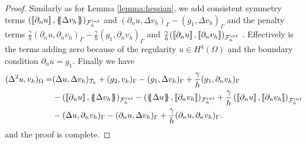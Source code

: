 \begin{proof}
Similarly as for Lemma \ref{lemma:hessian}, we add consistent symmetry terms $(  \left[\!\left[  \partial _{n} u  \right]\!\right], \left\{\!\!\left\{ \Delta  v_{h} \right\}\!\!\right\})_{\mathcal{F}^{int}_{h} } $ and $(  \partial _{n} u, \Delta  v_{h}       )_{\Gamma  } -(  g_{1}, \Delta  v_{h}  )_{\Gamma  }  $ and
the penalty terms $ \frac{\gamma }{h} (  \partial _{n} u, \partial _{n}   v_{h}       )_{\Gamma  } -\frac{\gamma }{h}(  g_{1}, \partial _{n} v_{h}  )_{\Gamma  }$ and $\frac{\gamma }{h}( \left[\!\left[  \partial _{n} u  \right]\!\right] , \left[\!\left[  \partial _{n} v_{h}  \right]\!\right]
)_{\mathcal{F}^{int}_{h} }  $  . Effectively is the terms adding zero
because of the regularity $ u \in H^{4}( \Omega ) $ and the boundary condition $\partial _{n} u = g_{1}$.
Finally we have
\[
    \begin{split}
( \Delta ^2 u, v_{h} ) _{\Omega }  =& ( \Delta u, \Delta v_{h})_{\mathcal{T} _{h} }  + ( g_{2} , v_{h} )_{\Gamma }  - ( g_{1} , \Delta v_{h})_{\Gamma } + \frac{\gamma }{h} ( g_{1} ,  \partial _{n}v_{h})_{\Gamma }\\
& -  ( \jump{ \partial _{n} u} , \mean{ \Delta v_{h} })_{\mathcal{F}_{h}^{int} }-  (  \mean{ \Delta u }, \jump{ \partial _{n} v_{h}} )_{\mathcal{F}_{h}^{int} } + \frac{\gamma }{h}  \left( \jump{ \partial _{n} u}, \jump{ \partial _{n} v_{h}   }
\right)_{\mathcal{F}_{h}^{int} } \\
& - (  \Delta u , \partial _{n} v_{h})_{\Gamma }- ( \partial _{n} u, \Delta v_{h})_{\Gamma } + \frac{\gamma }{h}( \partial _{n} u, \partial _{n} v_{h})_{\Gamma }   .
    \end{split}
\]
and the proof is complete.
\end{proof}

